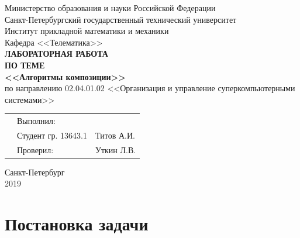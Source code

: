 \documentclass[]{article}
\numberwithin{equation}{section}
\begin{document}
    \thispagestyle{empty}
	\begin{center}
		Министерство образования и науки Российской Федерации\\
		Санкт-Петербургский государственный технический университет\\
		Институт прикладной математики и механики\\
		Кафедра <<Телематика>>\\
		\vspace{5cm}
		\textbf{\textbf{ЛАБОРАТОРНАЯ РАБОТА}}\\
        \vspace{0.5cm}
        \textbf{ПО ТЕМЕ}\\
        \vspace{0.5cm}
		\textbf{\textbf{<<Алгоритмы композиции>>}}\\
		\vspace{3cm}
		по направлению 02.04.01.02 <<Организация и управление суперкомпьютерными системами>>
	\end{center}
	\vspace{2cm}
	\begin{tabular} {l l l}
	\hspace{9.5cm} & Выполнил: & \\
	& Студент гр. 13643.1 & Титов А.И.\\
	& Проверил: & Уткин Л.В.
	\end{tabular}
	\vspace{4.5cm}
	\begin{center}
		Санкт-Петербург\\
		2019
    \end{center}


	\renewcommand\contentsname{Оглавление}
	\tableofcontents

    \newpage
    \section*{Постановка задачи}
\end{document}
